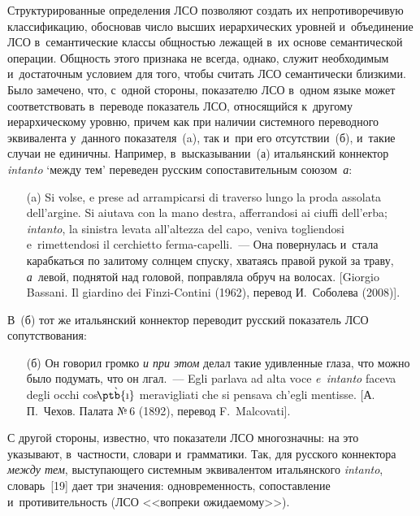 \begin{multicols}{2}
  Структурированные определения ЛСО поз\-во\-ля\-ют создать их 
непротиворечивую классификацию, обосновав чис\-ло высших иерархических 
уров\-ней и~объединение ЛСО в~семантические классы общ\-ностью лежащей в~их 
основе семантической операции. Общ\-ность этого признака не всегда, однако, 
служит необходимым и~достаточным условием для того, чтобы считать ЛСО 
семантически близ\-ки\-ми. Было замечено, что, с~одной стороны, показателю ЛСО 
в~одном языке может соответствовать в~переводе показатель ЛСО, 
относящийся к~другому иерархическому уров\-ню, причем как при наличии сис\-тем\-но\-го 
переводного эквивалента у~данного показателя~(a), так и~при его 
отсутствии~(б), и~такие случаи не единичны. Например, в~высказывании~(а) 
итальянский коннектор \textit{intanto} `меж\-ду тем' переведен русским 
со\-по\-ста\-ви\-тель\-ным союзом~\textit{а}:\\[-15pt] 
  \begin{itemize}
  \item[(a)] Si volse, e prese ad arrampicarsi di traverso lungo la proda assolata 
dell'argine. Si aiutava con la mano destra, afferrandosi ai ciuffi dell'erba; 
\textit{intanto}, la sinistra levata all'altezza del capo, veniva togliendosi 
e~rimettendosi il cerchietto ferma-capelli.~--- Она повернулась и~стала 
карабкаться по залитому солнцем спус\-ку, хватаясь правой рукой за траву, 
\textit{а}~левой, поднятой над головой, по\-прав\-ля\-ла обруч на волосах. [Giorgio 
Bassani. Il giardino dei Finzi-Contini (1962), перевод И.~Соболева (2008)]. 
  \end{itemize}

  В~(б) тот же итальянский коннектор переводит русский показатель ЛСО 
со\-пут\-ст\-во\-ва\-ния:\\[-15pt] 
  \begin{itemize}
  \item[(б)] Он говорил громко \textit{и при этом} делал такие удив\-ленные 
глаза, что мож\-но было подумать, что он лгал.~--- Egli parlava ad alta voce 
\textit{e~intanto} faceva degli occhi cos$\grave{\mbox{\!\ptb{\i}}}$ meravigliati che 
si pensava ch'egli mentisse. [А.\,П.~Чехов. Палата №\,6 (1892), перевод 
F.~Malcovati]. 
  \end{itemize}
  
  С другой стороны, известно, что показатели ЛСО многозначны: на это 
указывают, в~част\-ности, словари и~грамматики. Так, для русского коннектора 
\textit{между тем}, вы\-сту\-па\-юще\-го сис\-тем\-ным эквивалентом итальянского 
\textit{intanto}, словарь~[19] дает три значения: од\-но\-вре\-мен\-ность, 
со\-по\-став\-ле\-ние и~про\-ти\-ви\-тель\-ность (ЛСО <<вопреки ожи\-да\-емо\-му>>).
  

\end{multicols}
